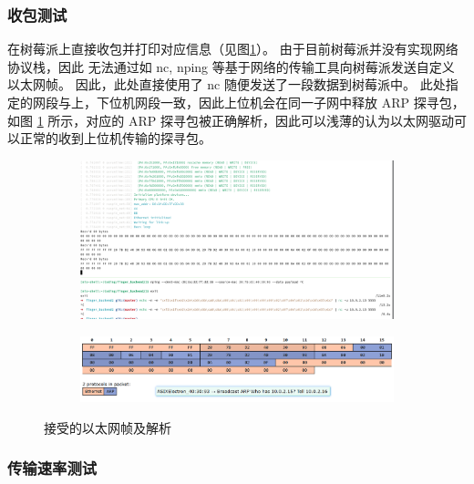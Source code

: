     \subsubsection{收包测试}

    在树莓派上直接收包并打印对应信息（见图\ref{test::以太网帧接收}）。
    由于目前树莓派并没有实现网络协议栈，因此
    无法通过如 nc, nping 等基于网络的传输工具向树莓派发送自定义以太网帧。
    因此，此处直接使用了 nc 随便发送了一段数据到树莓派中。
    此处指定的网段与上，下位机网段一致，因此上位机会在同一子网中释放 ARP 探寻包，
    如图 \ref{test::以太网帧接收} 所示，对应的 ARP 探寻包被正确解析，因此可以浅薄的认为以太网驱动可以正常的收到上位机传输的探寻包。

    \begin{figure}[ht]
        \centering
        \begin{subfigure}
            \centering
            \includegraphics[width=\textwidth]{./imgs/测试-以太网帧接收.png}
        \end{subfigure}
        \hfill
        \begin{subfigure}
            \centering
            \includegraphics[width=\textwidth]{./imgs/测试-以太网帧接收-解析.png}
        \end{subfigure}
        \caption{接受的以太网帧及解析} \label{test::以太网帧接收}
    \end{figure}

    \subsubsection{传输速率测试}

